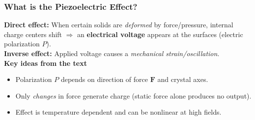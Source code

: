 \begin{frame}
	\frametitle{What is the Piezoelectric Effect?}
    \textbf{Direct effect:} When certain solids are \emph{deformed} by force/pressure, internal charge centers shift $\Rightarrow$ an \textbf{electrical voltage} appears at the surfaces (electric polarization $P$).\\[2mm]
    \textbf{Inverse effect:} Applied voltage causes a \emph{mechanical strain/oscillation}.\\[2mm]
    \textbf{Key ideas from the text}
    \begin{itemize}
        \item Polarization $P$ depends on direction of force $\mathbf{F}$ and crystal axes.
        \item Only \emph{changes} in force generate charge (static force alone produces no output).
        \item Effect is temperature dependent and can be nonlinear at high fields.
    \end{itemize}
\end{frame}


